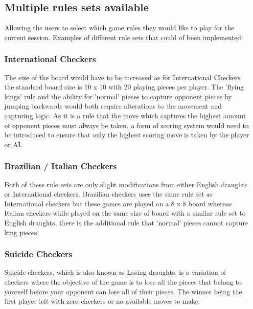 \documentclass[10pt, a4paper]{article}
\begin{document}
    \subsection{Multiple rules sets available}
    Allowing the users to select which game rules they would like to play for the current session. Examples of different rule sets that could of been implemented: 
    
    \subsubsection{International Checkers}
    The size of the board would have to be increased as for International Checkers the standard board size is 10 x 10 with 20 playing pieces per player. The 'flying kings' rule and the ability for 'normal' pieces to capture 
    \newline
    opponent pieces by jumping backwards would both 
    \newline
    require alterations to the movement and capturing logic.    
    As it is a rule that the move which captures the highest amount of opponent pieces must always be taken, a form of scoring system would need to be introduced to ensure that only the highest scoring move is taken by the player or AI.
    
    \subsubsection{Brazilian / Italian Checkers}
    Both of these rule sets are only slight modifications from either English draughts or International checkers. 
    \newline
    Brazilian checkers uses the same rule set as International checkers but these games are played on a 8 x 8 board whereas Italian checkers while played on the same size of board with a similar rule set to English draughts, there is the additional rule that 'normal' pieces cannot capture king pieces.
    
    \subsubsection{Suicide Checkers}
    Suicide checkers, which is also known as Losing draughts, is a variation of checkers where the objective of the game is to lose all the pieces that belong to 
    \newline
    yourself before your opponent can lose all of their pieces. The winner being the first player left with zero checkers or no available moves to make. 
    
\end{document}
